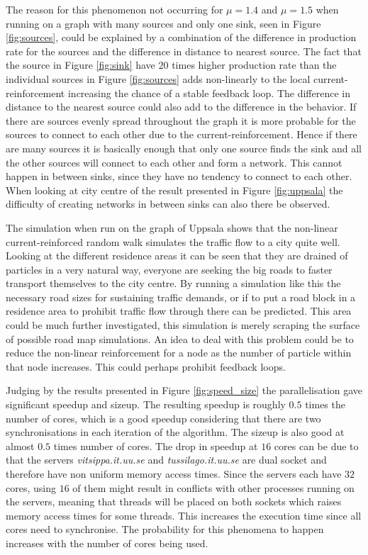 The reason for this phenomenon not occurring for $\mu = 1.4$ and $\mu = 1.5$ when running on a graph with many sources and only one sink, seen in Figure \ref{fig:sources}, could be explained by a combination of the difference in production rate for the sources and the difference in distance to nearest source. The fact that the source in Figure \ref{fig:sink} have $20$ times higher production rate than the individual sources in Figure \ref{fig:sources} adds non-linearly to the local current-reinforcement increasing the chance of a stable feedback loop. The difference in distance to the nearest source could also add to the difference in the behavior. If there are sources evenly spread throughout the graph it is more probable for the sources to connect to each other due to the current-reinforcement. Hence if there are many sources it is basically enough that only one source finds the sink and all the other sources will connect to each other and form a network. This cannot happen in between sinks, since they have no tendency to connect to each other. When looking at city centre of the result presented in Figure \ref{fig:uppsala} the difficulty of creating networks in between sinks can also there be observed.

The simulation when run on the graph of Uppsala shows that the non-linear current-reinforced random walk simulates the traffic flow to a city quite well. Looking at the different residence areas it can be seen that they are drained of particles in a very natural way, everyone are seeking the big roads to faster transport themselves to the city centre. By running a simulation like this the necessary road sizes for sustaining traffic demands, or if to put a road block in a residence area to prohibit traffic flow through there can be predicted. This area could be much further investigated, this simulation is merely scraping the surface of possible road map simulations. An idea to deal with this problem could be to reduce the non-linear reinforcement for a node as the number of particle within that node increases. This could perhaps prohibit feedback loops.

Judging by the results presented in Figure \ref{fig:speed_size} the parallelisation gave significant speedup and sizeup. The resulting speedup is roughly $0.5$ times the number of cores, which is a good speedup considering that there are two synchronisations in each iteration of the algorithm. The sizeup is also good at almost $0.5$ times number of cores. The drop in speedup at $16$ cores can be due to that the servers \textit{vitsippa.it.uu.se} and \textit{tussilago.it.uu.se} are dual socket and therefore have non uniform memory access times. Since the servers each have $32$ cores, using $16$ of them might result in conflicts with other processes running on the servers, meaning that threads will be placed on both sockets which raises memory access times for some threads. This increases the execution time since all cores need to synchronise. The probability for this phenomena to happen increases with the number of cores being used.

